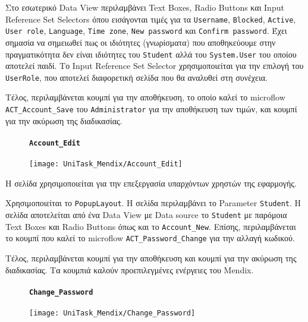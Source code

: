                     Στο εσωτερικό Data View περιλαμβάνει Text Boxes, Radio Buttons και Input \linebreak Reference Set Selectors όπου εισάγονται τιμές για τα \texttt{Username}, \texttt{Blocked}, \texttt{Active}, \texttt{User role}, \texttt{Language}, \texttt{Time zone}, \texttt{New password} και \texttt{Confirm password}. Έχει σημασία να σημειωθεί πως οι ιδιότητες (γνωρίσματα) που αποθηκεύουμε στην πραγματικότητα δεν είναι ιδιότητες του \texttt{Student} αλλά του \texttt{System.User} του οποίου αποτελεί παιδί. Το Input Reference Set Selector χρησιμοποιείται για την επιλογή του \texttt{UserRole}, που αποτελεί διαφορετική σελίδα που θα αναλυθεί στη συνέχεια.

                    Τέλος, περιλαμβάνεται κουμπί για την αποθήκευση, το οποίο καλεί το microflow \texttt{ACT\_Account\_Save} του \texttt{Administrator} για την αποθήκευση των τιμών, και κουμπί για την ακύρωση της διαδικασίας.

                \begin{figure}[H] \noindent
                    \paragraph{\texttt{Account\_Edit}}
                    \begin{center}
                        \texttt{[image: UniTask\_Mendix/Account\_Edit]}
                    \end{center}
                \end{figure}

                    Η σελίδα χρησιμοποιείται για την επεξεργασία υπαρχόντων χρηστών της εφαρμογής.

                    Χρησιμοποιείται το \texttt{PopupLayout}. Η σελίδα περιλαμβάνει το Parameter \texttt{Student}. Η σελίδα αποτελείται από ένα Data View με Data source το \texttt{Student} με παρόμοια Text Boxes και Radio Buttons όπως και το \texttt{Account\_New}. Επίσης, περιλαμβάνεται το κουμπί που καλεί το microflow \texttt{ACT\_Password\_Change} για την αλλαγή κωδικού.

                    Τέλος, περιλαμβάνεται κουμπί για την αποθήκευση και κουμπί για την ακύρωση της διαδικασίας. Τα κουμπιά καλούν προεπιλεγμένες ενέργειες του Mendix.

                \begin{figure}[H] \noindent
                    \paragraph{\texttt{Change\_Password}}
                    \begin{center}
                        \texttt{[image: UniTask\_Mendix/Change\_Password]}
                    \end{center}
                \end{figure}

